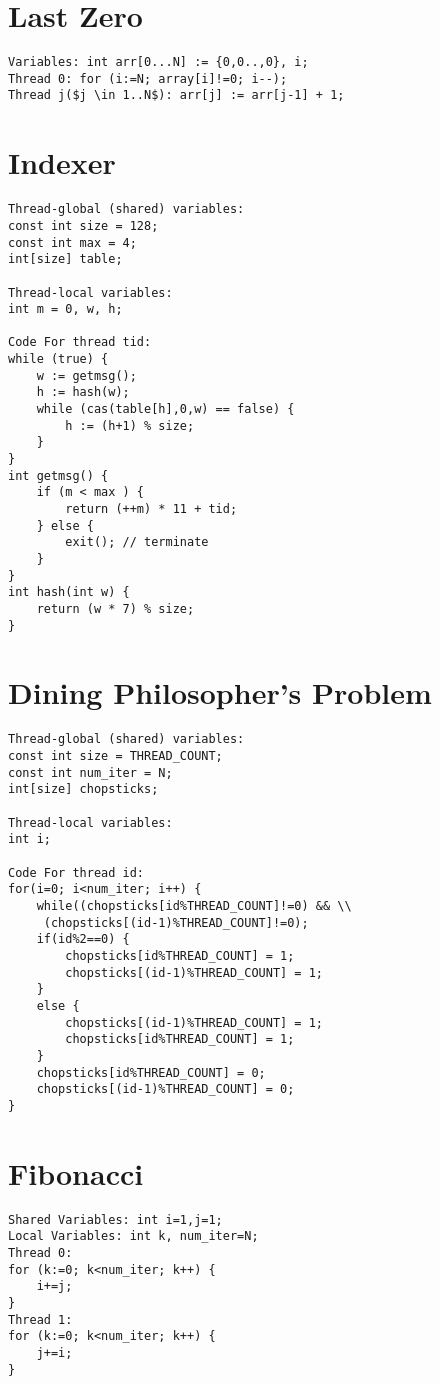 \section{Last Zero}
\begin{lstlisting}[mathescape=true,style=customc,caption={Last Zero Program based on \citet{abdulla2014optimal}},label={code_lastzero}]
Variables: int arr[0...N] := {0,0..,0}, i;
Thread 0: for (i:=N; array[i]!=0; i--);
Thread j($j \in 1..N$): arr[j] := arr[j-1] + 1;
\end{lstlisting}

\section{Indexer}
\begin{lstlisting}[style=customc,caption={Indexer Program based on \citet{dynamic_por}},label={code_indexer}]
Thread-global (shared) variables:
const int size = 128;
const int max = 4;
int[size] table;

Thread-local variables:
int m = 0, w, h;

Code For thread tid:
while (true) {
	w := getmsg();
	h := hash(w);
	while (cas(table[h],0,w) == false) {
		h := (h+1) % size;
	}
}
int getmsg() {
	if (m < max ) {
		return (++m) * 11 + tid;
	} else {
		exit(); // terminate
	}
}
int hash(int w) {
	return (w * 7) % size;
}
\end{lstlisting}
\newpage
\section{Dining Philosopher's Problem}

\begin{lstlisting}[style=customc,caption={Dining Philosopher's Problem Program},label={code_dining_phil}]
Thread-global (shared) variables:
const int size = THREAD_COUNT;
const int num_iter = N;
int[size] chopsticks;

Thread-local variables:
int i;

Code For thread id:
for(i=0; i<num_iter; i++) {
	while((chopsticks[id%THREAD_COUNT]!=0) && \\
	 (chopsticks[(id-1)%THREAD_COUNT]!=0);
	if(id%2==0) {
		chopsticks[id%THREAD_COUNT] = 1;
		chopsticks[(id-1)%THREAD_COUNT] = 1;
	}
	else {
		chopsticks[(id-1)%THREAD_COUNT] = 1;
		chopsticks[id%THREAD_COUNT] = 1;
	}
	chopsticks[id%THREAD_COUNT] = 0;
	chopsticks[(id-1)%THREAD_COUNT] = 0;
}
\end{lstlisting}

\section{Fibonacci}
\begin{lstlisting}[mathescape=true,style=customc,caption={Fibonacci Program},label={code_fibonacci}]
Shared Variables: int i=1,j=1;
Local Variables: int k, num_iter=N;
Thread 0: 
for (k:=0; k<num_iter; k++) {
	i+=j;
}		
Thread 1:
for (k:=0; k<num_iter; k++) {
	j+=i;
}		
\end{lstlisting}